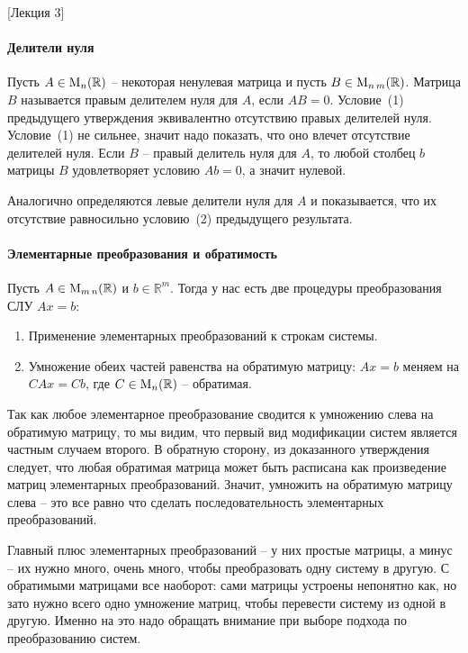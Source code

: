 [Лекция 3]


\paragraph{Делители нуля}

Пусть $A\in\operatorname{M}_{n}(\mathbb R)$ -- некоторая ненулевая матрица и пусть $B\in\operatorname{M}_{n\,m}(\mathbb R)$.
Матрица $B$ называется правым делителем нуля для $A$, если $AB = 0$.
Условие~(1) предыдущего утверждения эквивалентно отсутствию правых делителей нуля.
Условие~(1) не сильнее, значит надо показать, что оно влечет отсутствие делителей нуля.
Если $B$ -- правый делитель нуля для $A$, то любой столбец $b$ матрицы $B$ удовлетворяет условию $Ab = 0$, а значит нулевой.

Аналогично определяются левые делители нуля для $A$ и показывается, что их отсутствие равносильно условию~(2) предыдущего результата.

\paragraph{Элементарные преобразования и обратимость}

Пусть $A\in\operatorname{M}_{m\,n}(\mathbb R)$ и $b\in\mathbb R^m$.
Тогда у нас есть две процедуры преобразования СЛУ $Ax = b$:
\begin{enumerate}
\item Применение элементарных преобразований к строкам системы.

\item Умножение обеих частей равенства на обратимую матрицу: $Ax=b$ меняем на $CAx = Cb$, где $C\in\operatorname{M}_{n}(\mathbb R)$ -- обратимая.
\end{enumerate}

Так как любое элементарное преобразование сводится к умножению слева на обратимую матрицу, то мы видим, что первый вид модификации систем является частным случаем второго.
В обратную сторону, из доказанного утверждения следует, что любая обратимая матрица может быть расписана как произведение матриц элементарных преобразований.
Значит, умножить на обратимую матрицу слева -- это все равно что сделать последовательность элементарных преобразований.

Главный плюс элементарных преобразований -- у них простые матрицы, а минус -- их нужно много, очень много, чтобы преобразовать одну систему в другую.
С обратимыми матрицами все наоборот: сами матрицы устроены непонятно как, но зато нужно всего одно умножение матриц, чтобы перевести систему из одной в другую.
Именно на это надо обращать внимание при выборе подхода по преобразованию систем.

